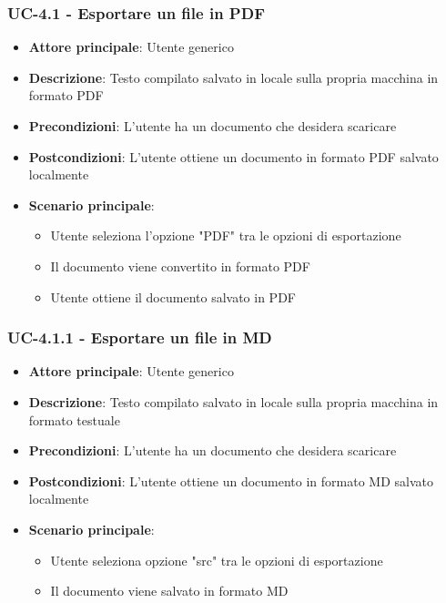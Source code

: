 \documentclass[11pt,a4paper]{article}
\begin{document}
\subsubsection{UC-4.1 - Esportare un file in PDF}
\begin{itemize}
    \item \textbf{Attore principale}: Utente generico
    \item \textbf{Descrizione}: Testo compilato salvato in locale sulla propria macchina in formato PDF
    \item \textbf{Precondizioni}: L'utente ha un documento che desidera scaricare
    \item \textbf{Postcondizioni}: L'utente ottiene un documento in formato PDF salvato localmente
    \item \textbf{Scenario principale}:
        \begin{itemize}
            \item Utente seleziona l'opzione "PDF" tra le opzioni di esportazione
            \item Il documento viene convertito in formato PDF
            \item Utente ottiene il documento salvato in PDF
        \end{itemize}
\end{itemize}

\subsubsection{UC-4.1.1 - Esportare un file in MD}
\begin{itemize}
    \item \textbf{Attore principale}: Utente generico
    \item \textbf{Descrizione}: Testo compilato salvato in locale sulla propria macchina in formato testuale
    \item \textbf{Precondizioni}: L'utente ha un documento che desidera scaricare
    \item \textbf{Postcondizioni}: L'utente ottiene un documento in formato MD salvato localmente
    \item \textbf{Scenario principale}:
        \begin{itemize}
            \item Utente seleziona opzione "src" tra le opzioni di esportazione
            \item Il documento viene salvato in formato MD
        \end{itemize}
\end{itemize}
\end{document}
